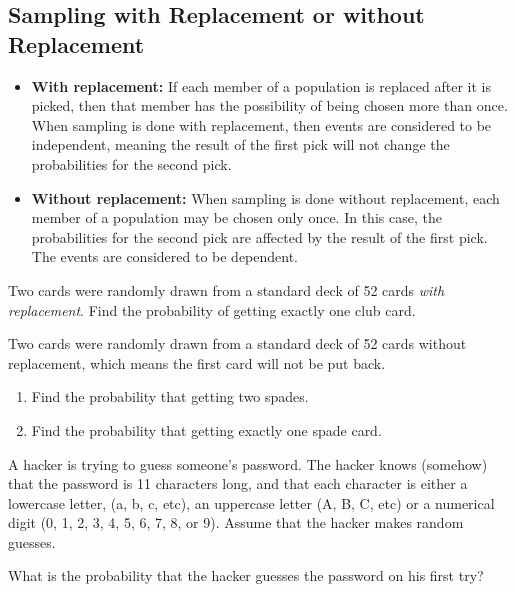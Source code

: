 \hypertarget{sampling-with-replacement-or-without-replacement}{%
\subsection{Sampling with Replacement or without
Replacement}\label{sampling-with-replacement-or-without-replacement}}

\begin{itemize}
\item
  \textbf{With replacement:} If each member of a population is replaced
  after it is picked, then that member has the possibility of being
  chosen more than once. When sampling is done with replacement, then
  events are considered to be independent, meaning the result of the
  first pick will not change the probabilities for the second pick.
\item
  \textbf{Without replacement:} When sampling is done without
  replacement, each member of a population may be chosen only once. In
  this case, the probabilities for the second pick are affected by the
  result of the first pick. The events are considered to be dependent.
\end{itemize}

\begin{example}

Two cards were randomly drawn from a standard deck of 52 cards
\emph{with replacement}. Find the probability of getting exactly one
club card.

\end{example}
\vspace*{6\baselineskip}

\begin{example}

Two cards were randomly drawn from a standard deck of 52 cards without
replacement, which means the first card will not be put back.

\begin{enumerate}
\item
  Find the probability that getting two spades.
\item
  Find the probability that getting exactly one spade card.
\end{enumerate}

\end{example}

\begin{exercise}

A hacker is trying to guess someone's password. The hacker knows (somehow) that the password is 11 characters long, and that each character is either a lowercase letter, (a, b, c, etc), an uppercase letter (A, B, C, etc) or a numerical digit (0, 1, 2, 3, 4, 5, 6, 7, 8, or 9). Assume that the hacker makes random guesses.

What is the probability that the hacker guesses the password on his first try?

\end{exercise}
\vspace*{6\baselineskip}

